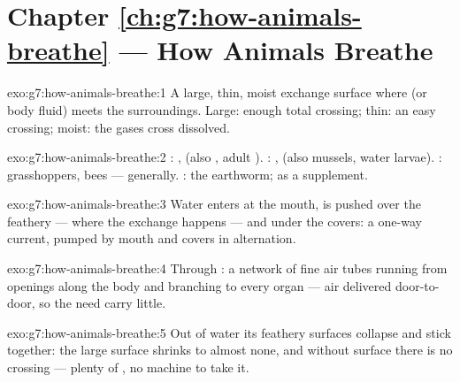 \section*{Chapter \ref{ch:g7:how-animals-breathe} --- How Animals Breathe}

\begin{solution}{exo:g7:how-animals-breathe:1}
A large, thin, moist exchange surface where  (or body
fluid) meets the surroundings. Large: enough total crossing;
thin: an easy crossing; moist: the gases cross dissolved.
\end{solution}

\begin{solution}{exo:g7:how-animals-breathe:2}
: ,  (also , adult ).
: ,  (also mussels, water larvae).
: grasshoppers, bees ---  generally. : the earthworm;  as a supplement.
\end{solution}

\begin{solution}{exo:g7:how-animals-breathe:3}
Water enters at the mouth, is pushed over the feathery 
--- where the exchange happens --- and  under the 
covers: a one-way current, pumped by mouth and covers in
alternation.
\end{solution}

\begin{solution}{exo:g7:how-animals-breathe:4}
Through : a network of fine air tubes running from
openings along the body and branching to every organ --- air
delivered door-to-door, so the  need carry little.
\end{solution}

\begin{solution}{exo:g7:how-animals-breathe:5}
Out of water its feathery  surfaces collapse and stick
together: the large surface shrinks to almost none, and
without surface there is no crossing --- plenty of ,
no machine to take it.
\end{solution}

